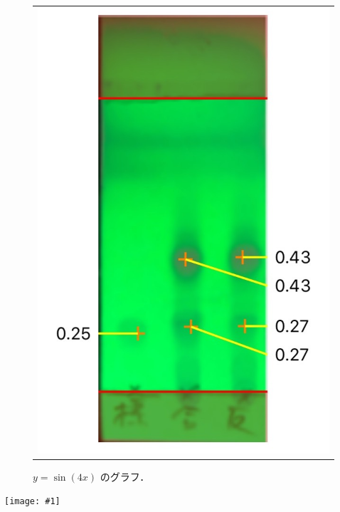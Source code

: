 \documentclass[a4paper,papersize,dvipdfmx]{jsarticle}
\newcommand{\pict}[2]{\begin{center} \texttt{[image: \#1]} \end{center}}   %
\begin{document}
\begin{figure}[htpb]
\begin{tabular}{c}
 
 
      \begin{minipage}{0.47\hsize}
        \centering
          \includegraphics[keepaspectratio, scale=0.60, angle=0]
                          {imgs4/tlc4.jpg}
                          \caption{$y=\sin(4x)$ のグラフ．}
                          \label{fig:sin_4x}
      \end{minipage}
 
 
    \end{tabular}
\end{figure}  


\pict{imgs-k/btr.png}{10}
\end{document}
